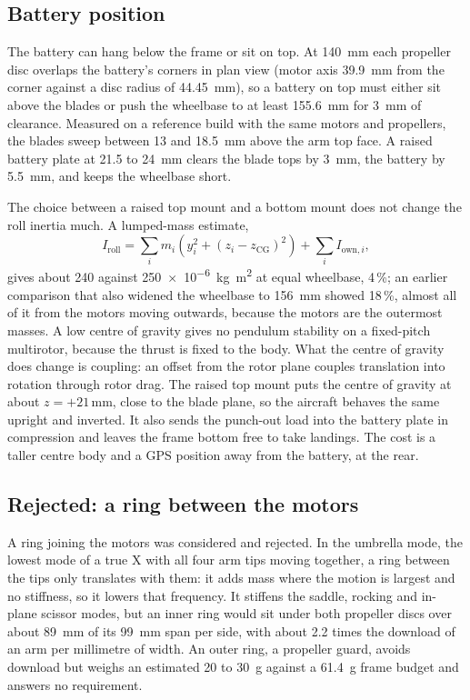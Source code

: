 \subsection{Battery position}

The battery can hang below the frame or sit on top. At \SI{140}{mm} each propeller disc overlaps the battery's corners in plan view (motor axis \SI{39.9}{mm} from the corner against a disc radius of \SI{44.45}{mm}), so a battery on top must either sit above the blades or push the wheelbase to at least \SI{155.6}{mm} for \SI{3}{mm} of clearance. Measured on a reference build with the same motors and propellers, the blades sweep between 13 and \SI{18.5}{mm} above the arm top face. A raised battery plate at 21.5 to \SI{24}{mm} clears the blade tops by \SI{3}{mm}, the battery by \SI{5.5}{mm}, and keeps the wheelbase short.

The choice between a raised top mount and a bottom mount does not change the roll inertia much. A lumped-mass estimate,
\begin{equation}
I_\text{roll} = \sum_i m_i \left(y_i^2 + (z_i - z_\text{CG})^2\right) + \sum_i I_{\text{own},i},
\end{equation}
gives about 240 against \SI{250e-6}{kg.m^2} at equal wheelbase, 4\,\%; an earlier comparison that also widened the wheelbase to \SI{156}{mm} showed 18\,\%, almost all of it from the motors moving outwards, because the motors are the outermost masses. A low centre of gravity gives no pendulum stability on a fixed-pitch multirotor, because the thrust is fixed to the body. What the centre of gravity does change is coupling: an offset from the rotor plane couples translation into rotation through rotor drag. The raised top mount puts the centre of gravity at about $z = +21$\,mm, close to the blade plane, so the aircraft behaves the same upright and inverted. It also sends the punch-out load into the battery plate in compression and leaves the frame bottom free to take landings. The cost is a taller centre body and a GPS position away from the battery, at the rear.

\subsection{Rejected: a ring between the motors}

A ring joining the motors was considered and rejected. In the umbrella mode, the lowest mode of a true X with all four arm tips moving together, a ring between the tips only translates with them: it adds mass where the motion is largest and no stiffness, so it lowers that frequency. It stiffens the saddle, rocking and in-plane scissor modes, but an inner ring would sit under both propeller discs over about \SI{89}{mm} of its \SI{99}{mm} span per side, with about 2.2 times the download of an arm per millimetre of width. An outer ring, a propeller guard, avoids download but weighs an estimated 20 to \SI{30}{g} against a \SI{61.4}{g} frame budget and answers no requirement.

